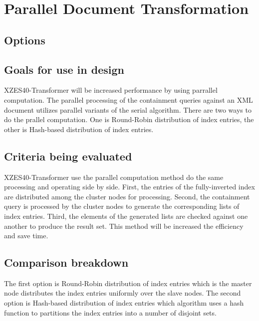 \section{Parallel Document Transformation}
\subsection{Options}
\subsection{Goals for use in design}

XZES40-Transformer will be increased performance by using parrallel computation.
The parallel processing of the containment queries against an XML document utilizes parallel variants of the serial algorithm. 
There are two ways to do the prallel computation. One is Round-Robin distribution of index entries, the other is Hash-based distribution of index entries. 

\subsection{Criteria being evaluated}

XZES40-Transformer use the parallel computation method do the same processing and operating side by side. First, the entries of the fully-inverted index are distributed among the cluster nodes for processing. Second, the containment query is processed by the cluster nodes to generate the corresponding lists of index entries. Third, the elements of the generated lists are checked against one another to produce the result set. This method will be increased the efficiency and save time. 

\subsection{Comparison breakdown}

The first option is Round-Robin distribution of index entries which is the master node distributes the index entries uniformly over the slave nodes. The second option is Hash-based distribution of index entries which algorithm uses a hash function to partitions the index entries into a number of disjoint sets.

